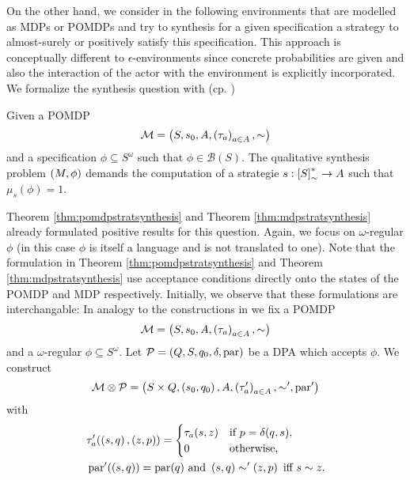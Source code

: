 On the other hand, we consider in the following environments that are modelled
as \acp{MDP} or \acp{POMDP} and try to synthesis for a given specification a
strategy to almost-surely or positively satisfy this specification. This
approach is conceptually different to $\epsilon$-environments since concrete
probabilities are given and also the interaction of the actor with the
environment is explicitly incorporated. We formalize the synthesis question
with (cp. \cite{QualAnaPOMDP,SimpleStochasticParityGames,%
ComplexProbVerification})
\begin{definition}
  Given a \ac{POMDP} 
  \begin{equation*}
    \mathcal{M} = \left(S, s_{0}, A, \left(\tau_{a}\right)_{a\in A}, \sim\right)
  \end{equation*}
  and a specification $\phi\subseteq S^{\omega}$ such that 
  $\phi\in\mathcal{B}(S)$. The qualitative synthesis problem 
  $\left(M, \phi\right)$ demands the computation of a strategie 
  $s:\left[S\right]_{\sim}^{*}\rightarrow A$ such that $\mu_{s}(\phi) = 1$.
\end{definition}
Theorem \ref{thm:pomdpstratsynthesis} and Theorem \ref{thm:mdpstratsynthesis}
already formulated positive results for this question. Again, we focus on
$\omega$-regular $\phi$ (in this case $\phi$ is itself a language
and is not translated to one). Note that the formulation in Theorem 
\ref{thm:pomdpstratsynthesis} and Theorem \ref{thm:mdpstratsynthesis} use 
acceptance conditions directly onto the states of the \ac{POMDP} and \ac{MDP}
respectively. Initially, we observe that these formulations are interchangable:
In analogy to the constructions in \cite{ComplexProbVerification,%
MDPandRegEvents} we fix a \ac{POMDP}
\begin{equation*}
  \mathcal{M} = \left(S, s_{0}, A, \left(\tau_{a}\right)_{a\in A}, \sim\right)
\end{equation*}
and a $\omega$-regular $\phi\subseteq S^{\omega}$. Let
$\mathcal{P} = \left(Q, S, q_{0}, \delta, \operatorname{par}\right)$ be a \ac{DPA} which
accepts $\phi$. We construct
\begin{equation*}
  \mathcal{M}\otimes\mathcal{P} = \left(S\times Q, \left(s_{0}, q_{0}\right), A, 
  \left(\tau'_{a}\right)_{a\in A}, \sim', \operatorname{par}'\right)
\end{equation*}
with
\begin{align*}
  &\tau'_{a}(\left(s, q\right), \left(z, p\right)) = \begin{cases}
    \tau_{a}(s, z)&\text{if }p = \delta(q,s),\\
    0&\text{otherwise,}
  \end{cases}\\
  &\operatorname{par}'(\left(s,q\right)) = \operatorname{par}(q)
  \text{ and }
  \left(s, q\right)\sim'\left(z, p\right)\text{ iff }s\sim z.
\end{align*}
